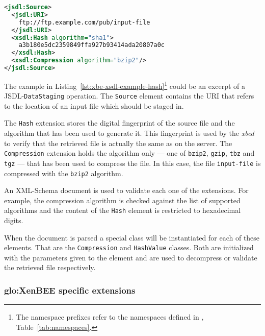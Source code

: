 \medskip
\begin{center}
  \begin{minipage}{.75\textwidth}
    \begin{lstlisting}[captionpos=b,backgroundcolor=\color{listingcolor},frame=lines,numbers=none,numberstyle=\tiny,caption={Example
        with the general \texttt{Hash} and \texttt{Compression}
        extensions.},label={lst:xbe-xsdl-example-hash},language=XML]
<jsdl:Source>
  <jsdl:URI>
    ftp://ftp.example.com/pub/input-file
  </jsdl:URI>
  <xsdl:Hash algorithm="sha1">
    a3b180e5dc2359849ffa927b93414ada20807a0c
  </xsdl:Hash>
  <xsdl:Compression algorithm="bzip2"/>
</jsdl:Source>
    \end{lstlisting}
  \end{minipage}
\end{center}

The    example   in   Listing~\ref{lst:xbe-xsdl-example-hash}\footnote{The
  namespace    prefixes    refer   to    the    namespaces   defined    in
  \emph{},       Table~\ref{tab:namespaces}.}
could  be  an  excerpt  of  a  JSDL-\texttt{DataStaging}  operation.   The
\texttt{Source} element contains the URI that refers to the location of an
input file which should be staged in.

The \texttt{Hash}  extension stores the digital fingerprint  of the source
file and the algorithm that has been used to generate it. This fingerprint
is used by  the \emph{xbed} to verify that the  retrieved file is actually
the same  as on the  server. The \texttt{Compression} extension  holds the
algorithm only --- one  of \texttt{bzip2}, \texttt{gzip}, \texttt{tbz} and
\texttt{tgz} ---  that has been used  to compress the file.  In this case,
the  file  \texttt{input-file}   is  compressed  with  the  \texttt{bzip2}
algorithm.

An XML-Schema document is used to validate each one of the extensions. For
example,  the  compression  algorithm  is  checked  against  the  list  of
supported  algorithms and  the  content of  the  \texttt{Hash} element  is
restricted to hexadecimal digits.

When the document is parsed a  special class will be instantiated for each
of    these   elements.    That    are   the    \texttt{Compression}   and
\texttt{HashValue} classes. Both are initialized with the parameters given
to the element  and are used to decompress or  validate the retrieved file
respectively.

\subsubsection{\gls{glo:XenBEE} specific extensions}

